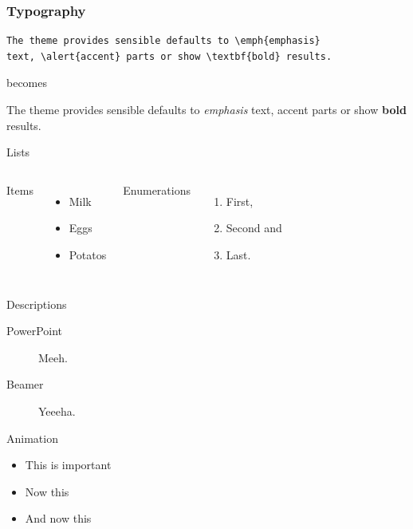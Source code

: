 \documentclass[12pt, compress]{beamer}
\begin{document}
\begin{frame}[fragile]
  \frametitle{Typography}
      \begin{verbatim}
The theme provides sensible defaults to \emph{emphasis}
text, \alert{accent} parts or show \textbf{bold} results.
      \end{verbatim}

  \begin{center}becomes\end{center}

  The theme provides sensible defaults to \emph{emphasis} text,
  \alert{accent} parts or show \textbf{bold} results.
\end{frame}
\begin{frame}{Lists}
  \begin{columns}[onlytextwidth]
      Items
      \begin{itemize}
        \item Milk \item Eggs \item Potatos
      \end{itemize}

      Enumerations
      \begin{enumerate}
        \item First, \item Second and \item Last.
      \end{enumerate}
  \end{columns}
\end{frame}
\begin{frame}{Descriptions}
  \begin{description}
    \item[PowerPoint] Meeh.
    \item[Beamer] Yeeeha.
  \end{description}
\end{frame}
\begin{frame}{Animation}
  \begin{itemize}[<+- | alert@+>]
    \item \alert<4>{This is important}
    \item Now this
    \item And now this
  \end{itemize}
\end{frame}
\end{document}
